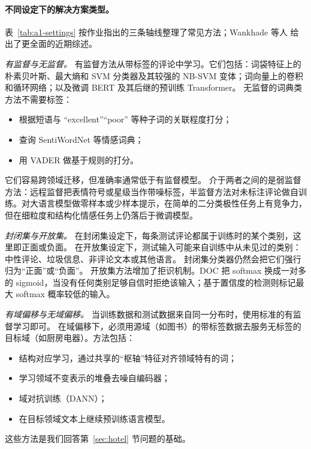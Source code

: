 \documentclass[11pt,a4paper]{article}
\begin{document}
\paragraph{不同设定下的解决方案类型。}
表~\ref{tab:a1-settings} 按作业指出的三条轴线整理了常见方法；Wankhade 等人\cite{wankhade2022survey} 给出了更全面的近期综述。

\emph{有监督与无监督。}
有监督方法从带标签的评论中学习。它们包括：词袋特征上的朴素贝叶斯、最大熵和 SVM 分类器及其较强的 NB-SVM 变体；词向量上的卷积和循环网络；以及微调 BERT\cite{devlin2019bert} 及其后继的预训练 Transformer。
无监督的词典类方法不需要标签：
\begin{itemize}
  \item 根据短语与 ``excellent''``poor'' 等种子词的关联程度打分；
  \item 查询 SentiWordNet 等情感词典；
  \item 用 VADER 做基于规则的打分。
\end{itemize}
它们容易跨领域迁移，但准确率通常低于有监督模型。
介于两者之间的是弱监督方法：远程监督把表情符号或星级当作带噪标签，半监督方法对未标注评论做自训练。对大语言模型做零样本或少样本提示，在简单的二分类极性任务上有竞争力，但在细粒度和结构化情感任务上仍落后于微调模型\cite{zhang2023sentiment}。

\emph{封闭集与开放集。}
在封闭集设定下，每条测试评论都属于训练时的某个类别，这里即正面或负面。
在开放集设定下，测试输入可能来自训练中从未见过的类别：中性评论、垃圾信息、非评论文本或其他语言。
封闭集分类器仍然会把它们强行归为``正面''或``负面''。
开放集方法增加了拒识机制。DOC 把 softmax 换成一对多的 sigmoid，当没有任何类别足够自信时拒绝该输入；基于置信度的检测则标记最大 softmax 概率较低的输入。

\emph{有域偏移与无域偏移。}
当训练数据和测试数据来自同一分布时，使用标准的有监督学习即可。
在域偏移下，必须用源域（如图书）的带标签数据去服务无标签的目标域（如厨房电器）。方法包括：
\begin{itemize}
  \item 结构对应学习，通过共享的``枢轴''特征对齐领域特有的词\cite{blitzer2007biographies}；
  \item 学习领域不变表示的堆叠去噪自编码器；
  \item 域对抗训练（DANN）；
  \item 在目标领域文本上继续预训练语言模型。
\end{itemize}
这些方法是我们回答第~\ref{sec:hotel} 节问题的基础。
\end{document}
